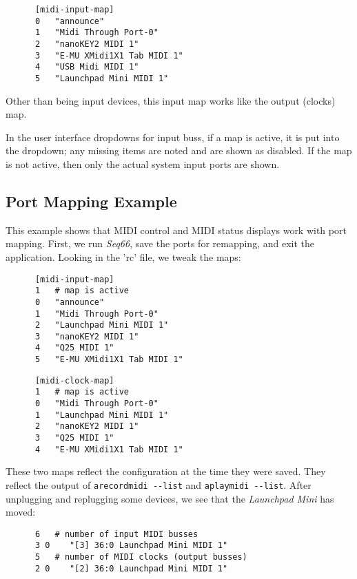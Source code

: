    \begin{verbatim}
      [midi-input-map]
      0   "announce"
      1   "Midi Through Port-0"
      2   "nanoKEY2 MIDI 1"
      3   "E-MU XMidi1X1 Tab MIDI 1"
      4   "USB Midi MIDI 1"
      5   "Launchpad Mini MIDI 1"
   \end{verbatim}

   Other than being input devices, this input map works like the output
   (clocks) map.

   In the user interface dropdowns for input buss, if a map is active, it is
   put into the dropdown; any missing items are noted and are shown as
   disabled.
   If the map is not active, then only the actual system input ports are shown.

\subsection{Port Mapping Example}
\label{subsec:input_port_mapping_example}

   This example shows that MIDI control and MIDI status displays work with
   port mapping.  First, we run \textsl{Seq66}, save the ports for
   remapping, and exit the application.  Looking in the 'rc' file, we tweak
   the maps:

   \begin{verbatim}
      [midi-input-map]
      1   # map is active
      0   "announce"
      1   "Midi Through Port-0"
      2   "Launchpad Mini MIDI 1"
      3   "nanoKEY2 MIDI 1"
      4   "Q25 MIDI 1"
      5   "E-MU XMidi1X1 Tab MIDI 1"
   \end{verbatim}

   \begin{verbatim}
      [midi-clock-map]
      1   # map is active
      0   "Midi Through Port-0"
      1   "Launchpad Mini MIDI 1"
      2   "nanoKEY2 MIDI 1"
      3   "Q25 MIDI 1"
      4   "E-MU XMidi1X1 Tab MIDI 1"
   \end{verbatim}

   These two maps reflect the configuration at the time they were saved.
   They reflect the output of \texttt{arecordmidi -{}-list} and
   \texttt{aplaymidi -{}-list}.
   After unplugging and replugging some devices, we see that the
   \textsl{Launchpad Mini} has moved:

   \begin{verbatim}
      6   # number of input MIDI busses
      3 0    "[3] 36:0 Launchpad Mini MIDI 1"
      5   # number of MIDI clocks (output busses)
      2 0    "[2] 36:0 Launchpad Mini MIDI 1"
   \end{verbatim}

